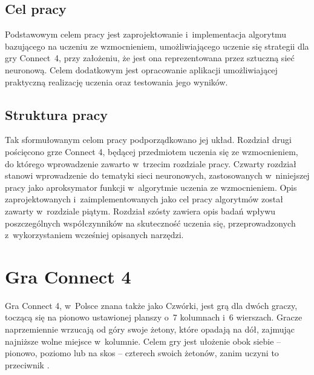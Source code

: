 \documentclass[a4paper, 12pt, oneside]{report}
\begin{document}
\section{Cel pracy}
Podstawowym celem pracy jest zaprojektowanie i~implementacja algorytmu bazującego na uczeniu ze wzmocnieniem, umożliwiającego uczenie się strategii dla gry Connect~4, przy założeniu, że jest ona reprezentowana przez sztuczną sieć neuronową. Celem dodatkowym jest opracowanie aplikacji umożliwiającej praktyczną realizację uczenia oraz testowania jego wyników.

\section{Struktura pracy}

Tak sformułowanym celom pracy podporządkowano jej układ. Rozdział drugi pościęcono grze Connect 4, będącej przedmiotem uczenia się ze wzmocnieniem, do którego wprowadzenie zawarto w~trzecim rozdziale pracy. Czwarty rozdział stanowi wprowadzenie do tematyki sieci neuronowych, zastosowanych w~niniejszej pracy jako aproksymator funkcji w~algorytmie uczenia ze wzmocnieniem. Opis zaprojektowanych i~zaimplementowanych jako cel pracy algorytmów został zawarty w~rozdziale piątym. Rozdział szósty zawiera opis badań wpływu poszczególnych współczynników na skuteczność uczenia się, przeprowadzonych z~wykorzystaniem wcześniej opisanych narzędzi.

\chapter{Gra Connect 4}

Gra Connect 4, w~Polsce znana także jako Czwórki, jest grą dla dwóch graczy, toczącą się na pionowo ustawionej planszy o~7 kolumnach i~6 wierszach. Gracze naprzemiennie wrzucają od góry swoje żetony, które opadają na dół, zajmując najniższe wolne miejsce w~kolumnie. Celem gry jest ułożenie obok siebie -- pionowo, poziomo lub na skos -- czterech swoich żetonów, zanim uczyni to przeciwnik \cite{wiki:ConnectFour}.
\end{document}
